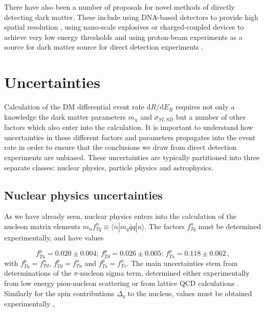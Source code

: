 There have also been a number of proposals for novel methods of directly detecting dark matter. These include using DNA-based detectors to provide high spatial resolution \cite{Drukier:2012}, using nano-scale explosives \cite{Lopez:2014} or charged-coupled devices \cite{Aguilar-Arevalo:2013} to achieve very low energy thresholds and using proton-beam experiments as a source for dark matter source for direct detection experiments \cite{deNiverville:2012}.



\section{Uncertainties}

Calculation of the DM differential event rate $\mathrm{d}R/\mathrm{d}E_R$ requires not only a knowledge the dark matter parameters $m_\chi$ and $\sigma_{SI,SD}$ but a number of other factors which also enter into the calculation. It is important to understand how uncertainties in these different factors and parameters propagates into the event rate in order to ensure that the conclusions we draw from direct detection experiments are unbiased. These uncertainties are typically partitioned into three separate classes: nuclear physics, particle physics and astrophysics.

\subsection{Nuclear physics uncertainties}
\label{sec:DD:nuclearunc}

As we have already seen, nuclear physics enters into the calculation of the nucleon matrix elements $m_n f_{Tq}^n \equiv \langle n|m_q\bar{q}q|n \rangle$. The factors $f_{Tq}^n$ must be determined experimentally, and have values

\begin{equation}
f_{Tu}^p = 0.020 \pm 0.004 ;\, f_{Td}^p = 0.026 \pm 0.005 ;\, f_{Ts}^p = 0.118 \pm 0.062\,,
\end{equation}
with $f_{Tu}^p = f_{Td}^n$, $f_{Td}^p = f_{Tu}^n$ and $f_{Ts}^p = f_{Ts}^n$. %
The main uncertainties stem from determinations of the $\pi$-nucleon sigma term, determined either experimentally from low energy pion-nucleon scattering \cite{Borasoy:1995, Pavan:2001,Alarcon:2012} or from lattice QCD calculations \cite{Bali:2012, Alvarez-Ruso:2014}. Similarly for the spin contributions $\Delta_q$ to the nucleus, values must be obtained experimentally \cite{Ashman:1988,Jaffe:1990,Engel:1992,Adams:1997},


